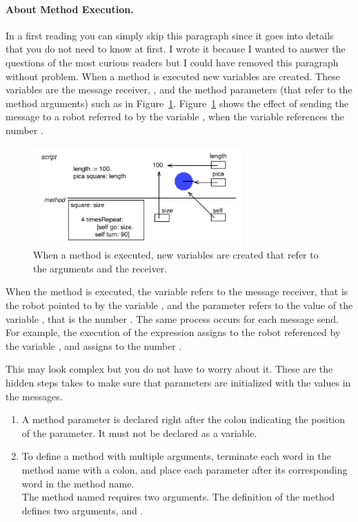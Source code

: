 \paragraph{About Method Execution.}
In a first reading you  can simply skip this paragraph since it goes into details that you do not need to know at first. I wrote it because I wanted to answer the questions of the most curious readers but I could have removed this paragraph without problem. When a method is executed new variables are created. These variables are the message receiver, , and the method parameters (that refer to the method arguments) such as  in Figure~\ref{fig:argumentswithboxes}. Figure~\ref{fig:argumentswithboxes} shows the effect of sending the message  to a robot referred to by the variable , when the variable  references the number . 
 
 \begin{figure}[h]
\begin{center}\includegraphics[width=8cm]{argumentBoxes}\end{center}
\caption{When a method is executed, new variables are created that refer to the arguments and the receiver. \label{fig:argumentswithboxes}}
\end{figure}

When the method  is executed, the variable  refers to the message receiver, that is the robot pointed to by the variable \caro, and the parameter  refers to the value of the variable , that is the number . 
The same process occurs for each message send. For example, the execution of the expression  assigns to \self the robot referenced by the variable \daly, and assigns to  the number . 

 
This may look complex but you do not have to worry about it. These are the hidden steps \sq takes to make sure that parameters are initialized with the values in the messages.


\summa

\begin{enumerate}
\item A method parameter is declared right after the colon
  indicating the position of the parameter. It must not be declared as a  variable.
  
 \item To define a method with multiple arguments, terminate each word in the method name with a colon, and place each parameter after its corresponding word in the method name.\\
The method named  requires two arguments. The definition of the method  defines two arguments,  and .\end{enumerate}


\ifx\wholebook\relax\else\fi
